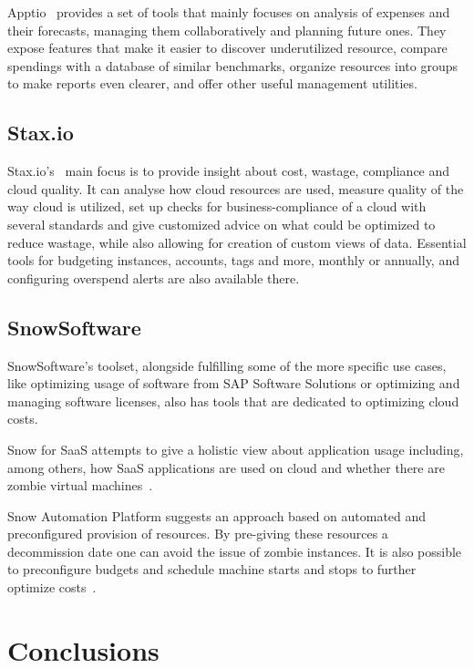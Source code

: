 \documentclass[licencjacka,en]{thesisclass}
\begin{document}
    Apptio~\cite{Apptio} provides a set of tools that mainly focuses on analysis
    of expenses and their forecasts,
    managing them collaboratively and planning future ones.
    They expose features that make it easier to discover underutilized resource,
    compare spendings with a database of similar benchmarks,
    organize resources into groups to make reports even clearer,
    and offer other useful management utilities.

    \subsection{Stax.io}

    Stax.io's~\cite{Stax.io} main focus is to provide insight about cost,
    wastage, compliance and cloud quality.
    It can analyse how cloud resources are used, measure quality of the way cloud is utilized,
    set up checks for business-compliance of a cloud with several standards
    and give customized advice on what could be optimized to reduce wastage,
    while also allowing for creation of custom views of data.
    Essential tools for budgeting instances, accounts, tags and more, monthly or annually,
    and configuring overspend alerts are also available there.

    \subsection{SnowSoftware}

    SnowSoftware's toolset, alongside fulfilling some of the more specific use cases,
    like optimizing usage of software from SAP Software Solutions or optimizing
    and managing software licenses,
    also has tools that are dedicated to optimizing cloud costs.

    Snow for SaaS attempts to give a holistic view about application usage
    including, among others, how SaaS applications are used
    on cloud and whether there are zombie virtual machines~\cite{SnowSaaS}.

    Snow Automation Platform suggests an approach based on automated
    and preconfigured provision of resources.
    By pre-giving these resources a decommission date one can avoid the issue of zombie instances.
    It is also possible to preconfigure budgets and schedule machine starts
    and stops to further optimize costs~\cite{SnowBlog}.

    \section{Conclusions}
\end{document}

